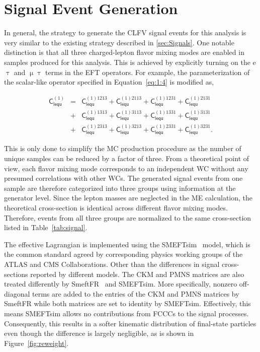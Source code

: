 \section{Signal Event Generation}
\label{sec:SigGen}

In general, the strategy to generate the \ac{CLFV} signal events for this analysis is very similar to the existing strategy described in \autoref{sec:Signals}. One notable distinction is that all three charged-lepton flavor mixing modes are enabled in samples produced for this analysis. This is achieved by explicitly turning on the e$\uptau$ and $\upmu\uptau$ terms in the \ac{EFT} operators. For example, the parameterization of the scalar-like operator specified in Equation~\ref{eq:1:4} is modified as,

\begin{eqnarray}
\textsf{C}_{\textsf{lequ}}^{(1)}  
 &=& \textsf{C}_{\textsf{lequ}}^{(1)1213}
 + \textsf{C}_{\textsf{lequ}}^{(1)2113}
 + \textsf{C}_{\textsf{lequ}}^{(1)1231}
 + \textsf{C}_{\textsf{lequ}}^{(1)2131} \nonumber\\
 &+& \textsf{C}_{\textsf{lequ}}^{(1)1313}
 + \textsf{C}_{\textsf{lequ}}^{(1)3113}
 + \textsf{C}_{\textsf{lequ}}^{(1)1331}
 + \textsf{C}_{\textsf{lequ}}^{(1)3131} \\
 &+& \textsf{C}_{\textsf{lequ}}^{(1)2313}
 + \textsf{C}_{\textsf{lequ}}^{(1)3213}
 + \textsf{C}_{\textsf{lequ}}^{(1)2331}
 + \textsf{C}_{\textsf{lequ}}^{(1)3231}. \nonumber
\label{eq:example}
\end{eqnarray}

This is only done to simplify the \ac{MC} production procedure as the number of unique samples can be reduced by a factor of three. From a theoretical point of view, each flavor mixing mode corresponds to an independent \ac{WC} without any presumed correlations with other \acp{WC}. The generated signal events from one sample are therefore categorized into three groups using information at the generator level. Since the lepton masses are neglected in the \ac{ME} calculation, the theoretical cross-section is identical across different flavor mixing modes. Therefore, events from all three groups are normalized to the same cross-section listed in Table~\ref{tab:signal}. 

The effective Lagrangian is implemented using the SMEFTsim~\cite{Brivio:2017btx} model, which is the common standard agreed by corresponding physics working groups of the \ac{ATLAS} and \ac{CMS} Collaborations. Other than the differences in signal cross-sections reported by different models. The \ac{CKM} and \ac{PMNS} matrices are also treated differently by SmeftFR~\cite{Dedes:2019uzs} and SMEFTsim. More specifically, nonzero off-diagonal terms are added to the entries of the \ac{CKM} and \ac{PMNS} matrices by SmeftFR while both matrices are set to identity by SMEFTsim. Effectively, this means SMEFTsim allows no contributions from \acp{FCCC} to the signal processes. Consequently, this results in a softer kinematic distribution of final-state particles even though the difference is largely negligible, as is shown in Figure~\ref{fig:reweight}.

